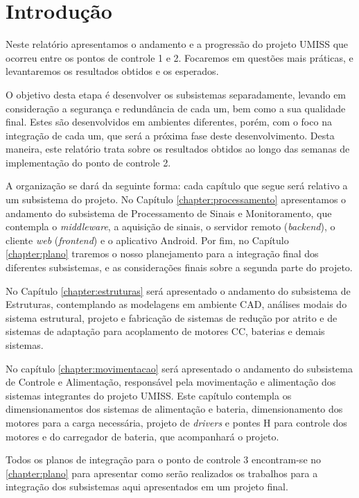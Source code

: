 \chapter{Introdução}

Neste relatório apresentamos o andamento e a progressão do projeto UMISS que
ocorreu entre os pontos de controle 1 e 2. Focaremos em questões mais práticas,
e levantaremos os resultados obtidos e os esperados.

O objetivo desta etapa é desenvolver os subsistemas separadamente, levando em
consideração a segurança e redundância de cada um, bem como a sua qualidade final.
Estes são desenvolvidos em ambientes diferentes, porém, com o foco na integração de cada
um, que será a próxima fase deste desenvolvimento. Desta maneira, este relatório
trata sobre os resultados obtidos ao longo das semanas de implementação
do ponto de controle 2.

A organização se dará da seguinte forma: cada capítulo que segue será relativo
a um subsistema do projeto. No Capítulo \ref{chapter:processamento}
apresentamos o andamento do subsistema de Processamento de Sinais e
Monitoramento, que contempla o \textit{middleware}, a aquisição de sinais, o
servidor remoto (\textit{backend}), o cliente \textit{web} (\textit{frontend})
e o aplicativo Android. Por fim, no Capítulo \ref{chapter:plano} traremos o
nosso planejamento para a integração final dos diferentes subsistemas, e
as considerações finais sobre a segunda parte do projeto.

No Capítulo \ref{chapter:estruturas} será apresentado o andamento do subsistema
de Estruturas, contemplando as modelagens em ambiente CAD, análises modais do
sistema estrutural, projeto e fabricação de sistemas de redução por atrito e
de sistemas de adaptação para acoplamento de motores CC, baterias e demais sistemas.

No capítulo \ref{chapter:movimentacao} será apresentado o andamento do subsistema
de Controle e Alimentação, responsável pela movimentação e alimentação dos sistemas
integrantes do projeto UMISS. Este capítulo contempla os dimensionamentos dos
sistemas de alimentação e bateria, dimensionamento dos motores para a carga necessária,
projeto de \textit{drivers} e pontes H para controle dos motores e do carregador
de bateria, que acompanhará o projeto.

Todos os planos de integração para o ponto de controle 3 encontram-se no \ref{chapter:plano}
para apresentar como serão realizados os trabalhos para a integração dos subsistemas
aqui apresentados em um projeto final.
